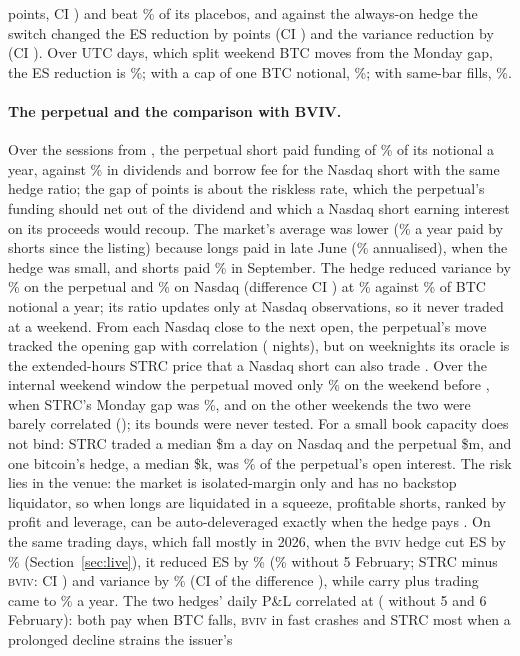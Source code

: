 \documentclass[10pt,a4paper]{article}
\newcommand{\BVIV}{\textsc{bviv}}
\begin{document}
\StrcDRatchet{} points, CI \StrcDRatchetCi) and beat \StrcPlaceboBeaten\% of its \StrcPlaceboN{} placebos, and against the always-on hedge the switch changed the ES reduction by \StrcDSwitch{} points (CI \StrcDSwitchCi) and the variance reduction by \StrcDSwitchVar{} (CI \StrcDSwitchVarCi). Over UTC days, which split weekend BTC moves from the Monday gap, the ES reduction is \StrcEsUtc\%; with a cap of one BTC notional, \StrcEsCapOne\%; with same-bar fills, \StrcEsSame\%.

\paragraph{The perpetual and the comparison with BVIV.} Over the \StrcWinDays{} sessions from \StrcWinStart, the perpetual short paid funding of \StrcCarryPerp\% of its notional a year, against \StrcCarryCash\% in dividends and borrow fee for the Nasdaq short with the same hedge ratio; the gap of \StrcCarryGap{} points is about the riskless rate, which the perpetual's funding should net out of the dividend and which a Nasdaq short earning interest on its proceeds would recoup. The market's average was lower (\StrcFundPerp\% a year paid by shorts since the listing) because longs paid in late June (\StrcFundJun\% annualised), when the hedge was small, and shorts paid \StrcFundSep\% in September. The hedge reduced variance by \StrcWinVarPerp\% on the perpetual and \StrcWinVarCash\% on Nasdaq (difference CI \StrcWinDVarCi) at \StrcWinCostPerp\% against \StrcWinCostCash\% of BTC notional a year; its ratio updates only at Nasdaq observations, so it never traded at a weekend. From each Nasdaq close to the next open, the perpetual's move tracked the opening gap with correlation \StrcNightCorr{} (\StrcNights{} nights), but on weeknights its oracle is the extended-hours STRC price that a Nasdaq short can also trade \citep{barclay2003price}. Over the internal weekend window the perpetual moved only \StrcWeekendBig\% on the weekend before \StrcWeekendBigDay, when STRC's Monday gap was \StrcWeekendBigGap\%, and on the other \StrcWeekends{} weekends the two were barely correlated (\StrcWeekendCorr); its bounds were never tested. For a small book capacity does not bind: STRC traded a median \$\StrcCashUsd{}m a day on Nasdaq and the perpetual \$\StrcPerpUsd{}m, and one bitcoin's hedge, a median \$\StrcHedgeUsd{}k, was \StrcOiShare\% of the perpetual's open interest. The risk lies in the venue: the market is isolated-margin only and has no backstop liquidator, so when longs are liquidated in a squeeze, profitable shorts, ranked by profit and leverage, can be auto-deleveraged exactly when the hedge pays \citep{tradexyz2026docs,chitra2025adl}. On the same trading days, which fall mostly in 2026, when the \BVIV{} hedge cut ES by \LiveEsYearC\% (Section~\ref{sec:live}), it reduced ES by \StrcBvivEs\% (\StrcBvivEsExFeb\% without 5 February; STRC minus \BVIV: CI \StrcVsBvivCi) and variance by \StrcBvivVar\% (CI of the difference \StrcVsBvivVarCi), while carry plus trading came to \StrcBvivCost\% a year. The two hedges' daily P\&L correlated at \StrcHedgeCorr{} (\StrcHedgeCorrEx{} without 5 and 6 February): both pay when BTC falls, \BVIV{} in fast crashes and STRC most when a prolonged decline strains the issuer's 
\end{document}
